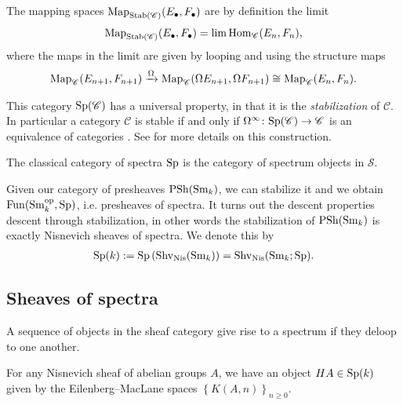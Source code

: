 \documentclass[11pt,openany]{book}
\begin{document}
The mapping spaces $\mathrm{Map}_{\mathrm{Stab}(\mathscr{C})}(E_\bullet, F_\bullet)$ are by definition the limit
\begin{align*}
    \mathrm{Map}_{\mathrm{Stab}(\mathscr{C})}(E_\bullet,F_\bullet) = \lim \mathrm{Hom}_\mathscr{C}(E_n, F_n),
\end{align*}
where the maps in the limit are given by looping and using the structure maps
\begin{align*}
    \mathrm{Map}_\mathscr{C}(E_{n+1}, F_{n+1}) \xrightarrow{\Omega} \mathrm{Map}_{\mathscr{C}}(\Omega E_{n+1}, \Omega F_{n+1}) \cong \mathrm{Map}_{\mathscr{C}}(E_n, F_n).
\end{align*}
%

\begin{remark} This category $\mathrm{Sp}(\mathscr{C})$ has a universal property, in that it is the \textit{stabilization} of $\mathscr{C}$. In particular a category $\mathscr{C}$ is stable if and only if $\Omega^\infty \colon \mathrm{Sp}(\mathscr{C}) \to \mathscr{C}$ is an equivalence of categories \cite[1.4.2.21]{HA}. See \cite[\S1.4.2]{HA} for more details on this construction.
\end{remark}



\begin{example} The classical category of spectra $\mathrm{Sp}$ is the category of spectrum objects in $\mathcal{S}$.
\end{example}

Given our category of presheaves $\mathrm{PSh}(\mathrm{Sm}_k)$, we can stabilize it and we obtain $\mathrm{Fun}(\mathrm{Sm}_k^{\mathrm{op}}, \mathrm{Sp})$, i.e. presheaves of spectra. It turns out the descent properties descent through stabilization, in other words the stabilization of $\mathrm{PSh}(\mathrm{Sm}_k)$ is exactly Nisnevich sheaves of spectra. We denote this by
%
\begin{align*}
    \mathrm{Sp}(k) := \mathrm{Sp} \left( \mathrm{Shv}_{\mathrm{Nis}}(\mathrm{Sm}_k) \right) = \mathrm{Shv}_{\mathrm{Nis}}(\mathrm{Sm}_k; \mathrm{Sp}).
\end{align*}
%
\subsection{Sheaves of spectra}

A sequence of objects in the sheaf category give rise to a spectrum if they deloop to one another.

\begin{example} For any Nisnevich sheaf of abelian groups $A$, we have an object $HA \in \mathrm{Sp}(k)$ given by the Eilenberg--MacLane spaces $\left\{ K(A,n) \right\}_{n\ge0}$. 
\end{example}
\end{document}
